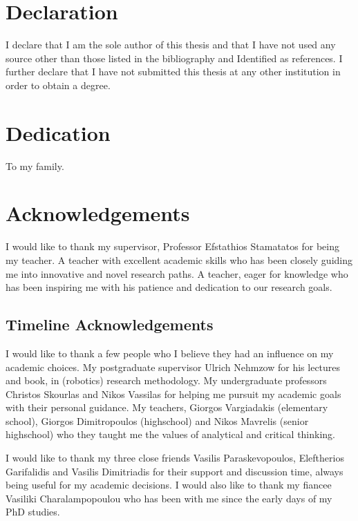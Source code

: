 \documentclass[
    12pt, %
    singlespacing, %
    headsepline, %
]{DoctoralThesis} %
\begin{document}
\section*{Declaration}
I declare that I am the sole author of this thesis and that I have not used any source other than those listed in the bibliography and Identified as references. I further declare that I have not submitted this thesis at any other institution in order to obtain a degree.

\newpage


\section*{Dedication}
To my family.

\newpage
 

\section*{Acknowledgements}
I would like to thank my supervisor, Professor Efstathios Stamatatos for being my teacher. A teacher with excellent academic skills who has been closely guiding me into innovative and novel research paths. A teacher, eager for knowledge who has been inspiring me with his patience and dedication to our research goals. 

\subsection*{Timeline Acknowledgements}
I would like to thank a few people who I believe they had an influence on my academic choices. My postgraduate supervisor Ulrich Nehmzow for his lectures and book, in (robotics) research methodology. My undergraduate professors Christos Skourlas and Nikos Vassilas for helping me pursuit my academic goals with their personal guidance. My teachers, Giorgos Vargiadakis (elementary school), Giorgos Dimitropoulos (highschool) and Nikos Mavrelis (senior highschool) who they taught me the values of analytical and critical thinking. 

I would like to thank my three close friends Vasilis Paraskevopoulos, Eleftherios Garifalidis and Vasilis Dimitriadis for their support and discussion time, always being useful for my academic decisions. I would also like to thank my fiancee Vasiliki Charalampopoulou who has been with me since the early days of my PhD studies.
\end{document}
